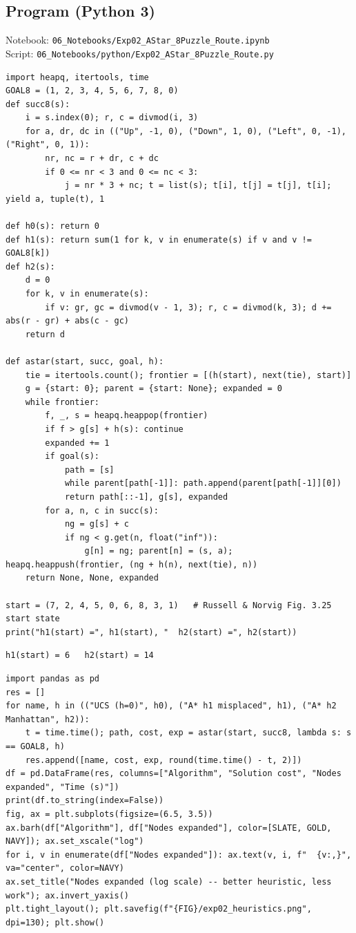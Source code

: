 \documentclass[11pt]{article}
\begin{document}
\subsection*{Program (Python 3)}
{\small\color{slate}Notebook: \texttt{06\_Notebooks/Exp02\_AStar\_8Puzzle\_Route.ipynb}\\ Script: \texttt{06\_Notebooks/python/Exp02\_AStar\_8Puzzle\_Route.py}}
\begin{lstlisting}[style=py]
import heapq, itertools, time
GOAL8 = (1, 2, 3, 4, 5, 6, 7, 8, 0)
def succ8(s):
    i = s.index(0); r, c = divmod(i, 3)
    for a, dr, dc in (("Up", -1, 0), ("Down", 1, 0), ("Left", 0, -1), ("Right", 0, 1)):
        nr, nc = r + dr, c + dc
        if 0 <= nr < 3 and 0 <= nc < 3:
            j = nr * 3 + nc; t = list(s); t[i], t[j] = t[j], t[i]; yield a, tuple(t), 1

def h0(s): return 0
def h1(s): return sum(1 for k, v in enumerate(s) if v and v != GOAL8[k])
def h2(s):
    d = 0
    for k, v in enumerate(s):
        if v: gr, gc = divmod(v - 1, 3); r, c = divmod(k, 3); d += abs(r - gr) + abs(c - gc)
    return d

def astar(start, succ, goal, h):
    tie = itertools.count(); frontier = [(h(start), next(tie), start)]
    g = {start: 0}; parent = {start: None}; expanded = 0
    while frontier:
        f, _, s = heapq.heappop(frontier)
        if f > g[s] + h(s): continue
        expanded += 1
        if goal(s):
            path = [s]
            while parent[path[-1]]: path.append(parent[path[-1]][0])
            return path[::-1], g[s], expanded
        for a, n, c in succ(s):
            ng = g[s] + c
            if ng < g.get(n, float("inf")):
                g[n] = ng; parent[n] = (s, a); heapq.heappush(frontier, (ng + h(n), next(tie), n))
    return None, None, expanded

start = (7, 2, 4, 5, 0, 6, 8, 3, 1)   # Russell & Norvig Fig. 3.25 start state
print("h1(start) =", h1(start), "  h2(start) =", h2(start))
\end{lstlisting}
\begin{lstlisting}[style=out]
h1(start) = 6   h2(start) = 14
\end{lstlisting}
\begin{lstlisting}[style=py]
import pandas as pd
res = []
for name, h in (("UCS (h=0)", h0), ("A* h1 misplaced", h1), ("A* h2 Manhattan", h2)):
    t = time.time(); path, cost, exp = astar(start, succ8, lambda s: s == GOAL8, h)
    res.append([name, cost, exp, round(time.time() - t, 2)])
df = pd.DataFrame(res, columns=["Algorithm", "Solution cost", "Nodes expanded", "Time (s)"])
print(df.to_string(index=False))
fig, ax = plt.subplots(figsize=(6.5, 3.5))
ax.barh(df["Algorithm"], df["Nodes expanded"], color=[SLATE, GOLD, NAVY]); ax.set_xscale("log")
for i, v in enumerate(df["Nodes expanded"]): ax.text(v, i, f"  {v:,}", va="center", color=NAVY)
ax.set_title("Nodes expanded (log scale) -- better heuristic, less work"); ax.invert_yaxis()
plt.tight_layout(); plt.savefig(f"{FIG}/exp02_heuristics.png", dpi=130); plt.show()
\end{lstlisting}
\end{document}
